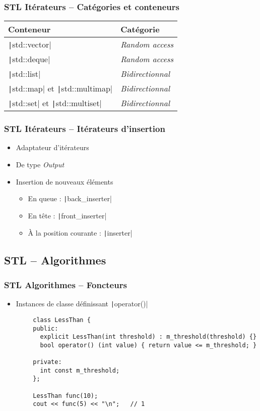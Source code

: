 \documentclass[C++.tex]{subfiles}
\begin{document}
\begin{frame}[fragile]
	\frametitle{STL Itérateurs -- Catégories et conteneurs}
	\begin{tabular}{ | p{5cm} | p{5cm} |}
		\hline
		Conteneur & Catégorie \\ 
		\hline
		\texttt|std::vector| & \textit{Random access} \\ 
		\hline
		\texttt|std::deque| & \textit{Random access} \\ 
		\hline
		\texttt|std::list| & \textit{Bidirectionnal} \\ 
		\hline
		\texttt|std::map| et \texttt|std::multimap| & \textit{Bidirectionnal} \\ 
		\hline
		\texttt|std::set| et \texttt|std::multiset| & \textit{Bidirectionnal} \\ 
		\hline
	\end{tabular} 
\end{frame}

\begin{frame}[fragile]
	\frametitle{STL Itérateurs -- Itérateurs d'insertion}
	\begin{itemize}
		\item Adaptateur d'itérateurs
		\item De type \textit{Output}
		\item Insertion de nouveaux éléments


		\begin{itemize}
			\item En queue : \texttt|back_inserter|
			\item En tête : \texttt|front_inserter|
			\item À la position courante : \texttt|inserter|

		\end{itemize}
	\end{itemize}
\end{frame}

\subsection*{STL -- Algorithmes}
\begin{frame}[fragile]
	\frametitle{STL Algorithmes -- Foncteurs}
	\begin{itemize}
		\item Instances de classe définissant \texttt|operator()|
	\end{itemize}

	\begin{verbatim}
		class LessThan {
		public:
		  explicit LessThan(int threshold) : m_threshold(threshold) {}
		  bool operator() (int value) { return value <= m_threshold; }

		private:
		  int const m_threshold;
		};

		LessThan func(10);
		cout << func(5) << "\n";   // 1
	\end{verbatim}
\end{frame}
\end{document}
